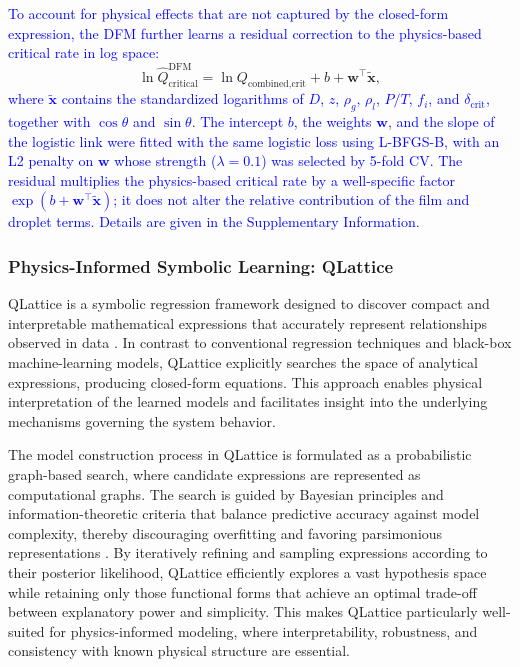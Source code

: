 \documentclass[journal=jacsat,manuscript=article]{achemso}
\newcommand{\al}{\textcolor{blue}}
\theoremstyle{thmstyleone}%
\theoremstyle{thmstyletwo}%
\theoremstyle{thmstylethree}%
\begin{document}
\al{To account for physical effects that are not captured by the closed-form expression, the DFM further learns a residual correction to the physics-based critical rate in log space:}
\begin{equation}
\ln \hat Q_{\text{critical}}^{\text{DFM}} = \ln Q_{\text{combined,crit}} + b + \mathbf{w}^{\top}\tilde{\mathbf{x}},
\label{eq:residual}
\end{equation}
\al{where $\tilde{\mathbf{x}}$ contains the standardized logarithms of $D$, $z$, $\rho_g$, $\rho_l$, $P/T$, $f_i$, and $\delta_{\text{crit}}$, together with $\cos\theta$ and $\sin\theta$. The intercept $b$, the weights $\mathbf{w}$, and the slope of the logistic link were fitted with the same logistic loss using L-BFGS-B, with an L2 penalty on $\mathbf{w}$ whose strength ($\lambda = 0.1$) was selected by 5-fold CV. The residual multiplies the physics-based critical rate by a well-specific factor $\exp(b + \mathbf{w}^{\top}\tilde{\mathbf{x}})$; it does not alter the relative contribution of the film and droplet terms. Details are given in the Supplementary Information.}

\subsubsection{Physics-Informed Symbolic Learning: QLattice}
QLattice is a symbolic regression framework designed to discover compact and interpretable mathematical expressions that accurately represent relationships observed in data \cite{Christensen2022QLattice}. In contrast to conventional regression techniques and black-box machine-learning models, QLattice explicitly searches the space of analytical expressions, producing closed-form equations. This approach enables physical interpretation of the learned models and facilitates insight into the underlying mechanisms governing the system behavior. 

The model construction process in QLattice is formulated as a probabilistic graph-based search, where candidate expressions are represented as computational graphs. The search is guided by Bayesian principles and information-theoretic criteria that balance predictive accuracy against model complexity, thereby discouraging overfitting and favoring parsimonious representations \cite{lundberg2020simple}. By iteratively refining and sampling expressions according to their posterior likelihood, QLattice efficiently explores a vast hypothesis space while retaining only those functional forms that achieve an optimal trade-off between explanatory power and simplicity. This makes QLattice particularly well-suited for physics-informed modeling, where interpretability, robustness, and consistency with known physical structure are essential.
\end{document}
